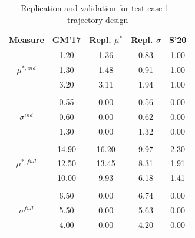 \documentclass[a4paper,12pt]{article}
\begin{document}
\newpage
\setlength{\tabcolsep}{12pt} %
\begin{table}[H]
	\centering
	\caption{Replication and validation for test case 1 - trajectory design}
	\label{tab:my-table}
		\renewcommand{\arraystretch}{1.2}%
	\begin{tabular}{cS[table-format=3.2]S[table-format=3.2]S[table-format=3.2]S[table-format=3.2]}
		\toprule
		{Measure}     & {GM'17}   & {Repl. $\mu^{*}$} & {Repl. $\sigma$} & {S'20} \\ \midrule


		& 1.20  & 1.36         & 0.83         & 1.00 \\
		\qquad $\mu^{*,ind}$                               & 1.30  & 1.48         & 0.91         & 1.00 \\
		& 3.20  & 3.11         & 1.94         & 1.00 \\
						&&&& \\
		& 0.55  & 0.00         & 0.56         & 0.00 \\
		\qquad $\sigma^{ind}$                            & 0.60  & 0.00         & 0.62         & 0.00 \\
		& 1.30  & 0.00         & 1.32         & 0.00 \\
						&&&& \\
		& 14.90 & 16.20        & 9.97         & 2.30 \\
		\qquad $\mu^{*,full}$                              & 12.50 & 13.45        & 8.31         & 1.91 \\
		& 10.00 & 9.93         & 6.18         & 1.41 \\
						&&&& \\
		& 6.50  & 0.00         & 6.74         & 0.00 \\
		\qquad $\sigma^{full}$                           & 5.50  & 0.00         & 5.63         & 0.00 \\
		& 4.00  & 0.00         & 4.20         & 0.00 \\
						
 \bottomrule
	\end{tabular}
\end{table}
\end{document}
